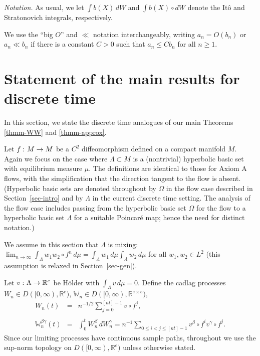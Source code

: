 \documentclass[aop,MSNbibl,seceqn,dvips]{arximspdf}
\newcommand{\R}{\mathbb{R}}
\newcommand{\BBW}{\mathbb{W}}
\begin{document}
\textit{Notation.}
As usual, we let $\int b(X) \,dW$ and $\int b(X)\circ dW$
denote the It\^o and Stratonovich integrals, respectively.

We use the ``big $O$'' and $\ll$ notation interchangeably, writing
$a_n=O(b_n)$ or $a_n\ll b_n$ if there is a constant $C>0$ such that
$a_n\le Cb_n$ for all $n\ge1$.

\section{Statement of the main results for discrete time}
\label{sec-discrete}

In this section, we state the discrete time analogues of our main
Theorems \ref{thmm-WW} and \ref{thmm-approx}.

Let $f\dvtx M\to M$ be a $C^2$ diffeomorphism defined on a compact
manifold $M$.
Again we focus on the case where $\Lambda\subset M$ is a (nontrivial)
hyperbolic basic set with equilibrium measure $\mu$. The definitions
are identical to those for Axiom A flows, with the simplification that
the direction tangent to the flow is absent.
(Hyperbolic basic sets are denoted throughout by $\Omega$ in the flow
case described in Section~\ref{sec-intro}
and by $\Lambda$ in the current discrete time setting. The analysis of
the flow case includes passing from the hyperbolic basic set $\Omega$
for the flow to a hyperbolic basic set $\Lambda$ for a suitable
Poincar\'e map; hence the need for distinct notation.)

We assume in this section that $\Lambda$ is mixing: $\lim_{n\to
\infty
}\int_\Lambda w_1 w_2\circ f^n \,d\mu=\int_\Lambda w_1 \,d\mu\int_\Lambda w_2 \,d\mu$ for all $w_1,w_2\in L^2$ (this assumption is
relaxed in
Section~\ref{sec-gen}).

Let $v\dvtx\Lambda\to\R^e$ be H\"older with $\int_\Lambda v \,d\mu=0$.
Define the cadlag processes $W_n\in D([0,\infty),\R^e)$,
$\BBW_n\in D([0,\infty),\R^{e\times e})$,
%
\begin{eqnarray}
\label{eq-WWW} W_n(t) & =&n^{-1/2}\sum
_{j=0}^{[nt]-1}v\circ f^j,
\nonumber
\\[-8pt]
\\[-8pt]
\nonumber
\BBW^{\beta\gamma}_n(t) &=&\int_0^t
W_n^\beta \,dW_n^\gamma=n^{-1}
\sum_{0\le i<j\le[nt]-1} v^\beta\circ f^i
v^\gamma\circ f^j.
\end{eqnarray}
%
Since our limiting processes have continuous sample paths, throughout
we use the sup-norm topology on $D([0,\infty),\R^e)$ unless otherwise stated.
\end{document}
